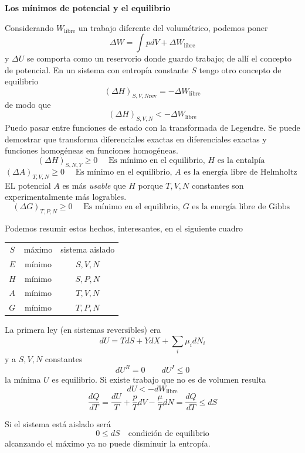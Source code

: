 \documentclass[10pt,oneside]{CBFT_book}
\begin{document}
\begin{ejemplo}{\bf Los mínimos de potencial y el equilibrio}

Considerando $W_{\text{libre}}$ un trabajo diferente del volumétrico, podemos poner
\[
	\Delta W = \int p dV + \Delta W_{\text{libre}}
\]
y $\Delta U$ se comporta como un reservorio donde guardo trabajo; de allí el concepto de potencial.
En un sistema con entropía constante $S$ tengo otro concepto de equilibrio
\[
	(\Delta H)_{{S,V,N}\text{rev}} = -  \Delta W_{\text{libre}}
\]
de modo que
\[
	(\Delta H)_{{S,V,N}} < -  \Delta W_{\text{libre}}
\]
Puedo pasar entre funciones de estado con la transformada de Legendre. Se puede demostrar que
transforma diferenciales exactas en diferenciales exactas y funciones homogéneas en
funciones homogéneas.
\[
	(\Delta H)_{S,N,Y} \geq 0 \quad 
	\text{ Es mínimo en el equilibrio, $H$ es la entalpía }
\]
\[
	(\Delta A)_{T,V,N} \geq 0 \quad 
	\text{ Es mínimo en el equilibrio, $A$ es la energía libre de Helmholtz }
\]
EL potencial $A$ es más {\it usable} que $H$ porque $T,V,N$ constantes son experimentalmente
más logrables.
\[
	(\Delta G)_{T,P,N} \geq 0 \quad 
	\text{ Es mínimo en el equilibrio, $G$ es la energía libre de Gibbs }
\]

Podemos resumir estos hechos, interesantes, en el siguiente cuadro

\begin{center}
\begin{tabular}{|c|c|c|}
\hline
$S$ & máximo & sistema aislado \\
$E$ & mínimo & $S,V,N$ \\
$H$ & mínimo & $S,P,N$ \\
$A$ & mínimo & $T,V,N$ \\
$G$ & mínimo & $T,P,N$ \\
\hline
\end{tabular}
\end{center}


\end{ejemplo}


La primera ley (en sistemas reversibles) era 
\[
	dU = TdS + YdX + \sum_i \mu_i dN_i
\]
y a $S,V,N$ constantes 
\[
	dU^R = 0 \qquad dU^I \leq 0
\]
la mínima $U$ es equilibrio.
Si existe trabajo que no es de volumen resulta 
\[
	dU < -dW_\text{libre}
\]
\[
	\frac{dQ}{dT} = \frac{dU}{T} + \frac{p}{T}dV - \frac{\mu}{T}dN = \frac{dQ}{dT} \leq dS
\]

Si el sistema está aislado será
\[
	0 \leq dS \quad \text{condición de equilibrio}
\]
alcanzando el máximo ya no puede disminuir la entropía.
\end{document}

